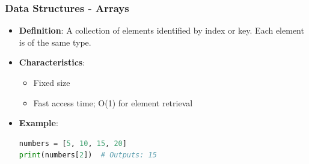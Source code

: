 \documentclass{beamer}
\begin{document}
\begin{frame}
    \frametitle{Data Structures - Arrays}
    \begin{itemize}
        \item \textbf{Definition}: A collection of elements identified by index or key. Each element is of the same type.
        \item \textbf{Characteristics}:
        \begin{itemize}
            \item Fixed size
            \item Fast access time; O(1) for element retrieval
        \end{itemize}
        \item \textbf{Example}:
        \begin{lstlisting}[language=Python]
numbers = [5, 10, 15, 20]
print(numbers[2])  # Outputs: 15
        \end{lstlisting}
    \end{itemize}
\end{frame}
\end{document}
